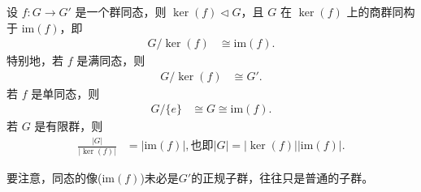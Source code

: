 \documentclass[../../main.tex]{subfiles}
\begin{document}
\begin{theorem}[群同构第一定理]\label{theorem:群同构第一定理}
设 \(f: G \to G'\) 是一个群同态，则 \(\ker(f) \lhd G\)，且 \(G\) 在 \(\ker(f)\) 上的商群同构于 \(\mathrm{im}(f)\)，即
\begin{align*}
G/\ker(f) &\cong \mathrm{im}(f) .
\end{align*}
特别地，若 \(f\) 是满同态，则
\begin{align*}
G/\ker(f) &\cong G' .
\end{align*}
若 \(f\) 是单同态，则
\begin{align*}
G/\{e\} &\cong G \cong \mathrm{im}(f).
\end{align*}
若 \(G\) 是有限群，则
\begin{align*}
\frac{|G|}{|\ker(f)|} &= |\mathrm{im}(f)| ,\text{也即}|G|=|\ker(f)||\mathrm{im}(f)|.
\end{align*}
\end{theorem}
\begin{remark}
要注意，同态的像($\mathrm{im}(f)$)未必是$G'$的正规子群，往往只是普通的子群。
\end{remark}
\end{document}
